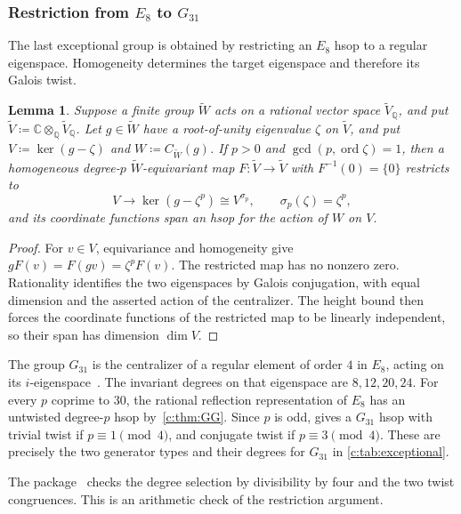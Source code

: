 \documentclass[11pt]{amsart}
\newcommand{\defeq}{\coloneqq}
\newtheorem{lemma}[theorem]{Lemma}
\theoremstyle{definition}
\newcommand{\C}{\mathbb C}\newcommand{\Q}{\mathbb Q}
\begin{document}
\subsubsection{Restriction from \texorpdfstring{$E_8$ to $G_{31}$}{E8 to G31}}\label{c:sec:eigenspace}

The last exceptional group is obtained by restricting an $E_8$ hsop
to a regular eigenspace. Homogeneity determines the target eigenspace
and therefore its Galois twist.

\begin{lemma}\label{c:lem:eigenspace}
Suppose a finite group $\widetilde W$ acts on a rational vector space
$\widetilde V_{\Q}$, and put
$\widetilde V\defeq\C\otimes_{\Q}\widetilde V_{\Q}$.
Let $g\in\widetilde W$ have a root-of-unity eigenvalue $\zeta$ on
$\widetilde V$, and put $V\defeq\ker(g-\zeta)$ and
$W\defeq C_{\widetilde W}(g)$. If $p>0$ and
$\gcd(p,\operatorname{ord}\zeta)=1$, then a homogeneous degree-$p$
$\widetilde W$-equivariant map $F:\widetilde V\to\widetilde V$
with $F^{-1}(0)=\{0\}$ restricts to
\[
 V\longrightarrow \ker(g-\zeta^p)\cong V^{\sigma_p},
 \qquad \sigma_p(\zeta)=\zeta^p,
\]
and its coordinate functions span an hsop for the action of $W$ on $V$.
\end{lemma}

\begin{proof}
For $v\in V$, equivariance and homogeneity give
$gF(v)=F(gv)=\zeta^pF(v)$. The restricted map has no nonzero zero.
Rationality identifies the two eigenspaces by Galois conjugation, with
equal dimension and the asserted action of the centralizer.
The height bound then forces the coordinate functions of the restricted
map to be linearly independent, so their span has dimension $\dim V$.
\end{proof}

The group $G_{31}$ is the centralizer of a regular element of order $4$
in $E_8$, acting on its $i$-eigenspace~\cite[Theorem~1.9(2) and Example~1.10]{Bessis}.
The invariant degrees on that eigenspace are $8,12,20,24$. For every
$p$ coprime to $30$, the rational reflection representation of $E_8$
has an untwisted degree-$p$ hsop by~\cref{c:thm:GG}. Since $p$ is odd,
 gives a $G_{31}$ hsop with trivial twist
if $p\equiv1\pmod4$, and conjugate twist if $p\equiv3\pmod4$.
These are precisely the two generator types and their degrees for
$G_{31}$ in \cref{c:tab:exceptional}.

The package~\cite{Computations} checks the degree selection by
divisibility by four and the two twist congruences. This is an
arithmetic check of the restriction argument.
\end{document}

